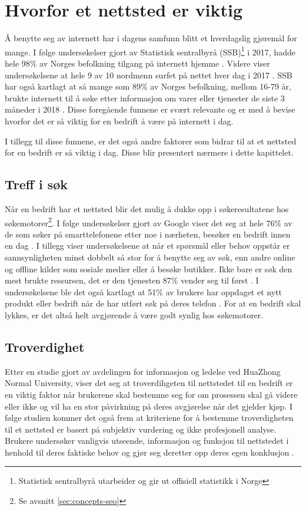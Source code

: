 \section{Hvorfor et nettsted er viktig}
Å benytte seg av internett har i dagens samfunn blitt et hverdagslig gjøremål for mange. I følge undersøkelser gjort av Statistisk sentralbyrå (SSB)\footnote{Statistisk sentralbyrå utarbeider og gir ut offisiell statistikk i Norge} i 2017, hadde hele 98\% av Norges befolkning tilgang på internett hjemme \cite{ssb17fim}. Videre viser undersøkelsene at hele 9 av 10 nordmenn surfet på nettet hver dag i 2017 \cite{ssb17nat}. SSB har også kartlagt  at så mange som 89\% av Norges befolkning, mellom 16-79 år, brukte internett til å søke etter informasjon om varer eller tjenester de siste 3 måneder i 2018 \cite{ssb18aup}. Disse foregående funnene er svært relevante og er med å bevise hvorfor det er så viktig for en bedrift å være på internett i dag.

I tillegg til disse funnene, er det også andre faktorer som bidrar til at et nettsted for en bedrift er så viktig i dag. Disse blir presentert nærmere i dette kapittelet. 

\subsection{Treff i søk}
\label{sec:search-results}
Når en bedrift har et nettsted blir det mulig å dukke opp i søkeresultatene hos søkemotorer\footnote{Se avsnitt \ref{sec:concepts-seo}}. I følge undersøkelser gjort av Google viser det seg at hele 76\% av de som søker på smarttelefonene etter noe i nærheten, besøker en bedrift innen en dag \cite{google16hms}. I tillegg viser undersøkelsene at når et spørsmål eller behov oppstår er sannsynligheten minst dobbelt så stor for å benytte seg av søk, enn andre online og offline kilder som sosiale medier eller å besøke butikker. Ikke bare er søk den mest brukte ressursen, det er den tjenesten 87\% vender seg til først \cite{google16mhc}. I undersøkelsene ble det også kartlagt at 51\% av brukere har oppdaget et nytt produkt eller bedrift når de har utført søk på deres telefon \cite{google16scp}. For at en bedrift skal lykkes, er det altså helt avgjørende å være godt synlig hos søkemotorer.




\subsection{Troverdighet}
\label{sec:analyse-troverdighet}
Etter en studie gjort av avdelingen for informasjon og ledelse ved HuaZhong Normal University, viser det seg at troverdihgeten til nettstedet til en bedrift er en viktig faktor når brukerene skal bestemme seg for om prosessen skal gå videre eller ikke og vil ha en stor påvirkning på deres avgjørelse når det gjelder kjøp. I følge studien kommer det også frem at kriteriene for å bestemme troverdigheten til et nettsted er basert på subjektiv vurdering og ikke profesjonell analyse. Brukere undersøker vanligvis utseende, informasjon og funksjon til nettstedet i henhold til deres faktiske behov og gjør seg deretter opp deres egen konklusjon \cite{zhao2009eew}.

